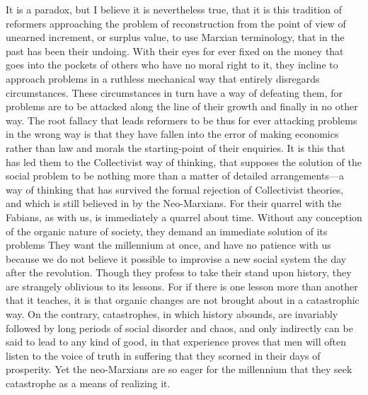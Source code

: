 \documentclass{book}
\begin{document}
It is a paradox, but I believe it is nevertheless true, that it is this tradition of reformers approaching the problem of reconstruction from the point of view of unearned increment, or surplus value, to use Marxian terminology, that in the past has been their undoing. With their eyes for ever fixed on the money that goes into the pockets of others who have no moral right to it, they incline to approach problems in a ruthless mechanical way that entirely disregards circumstances. These circumstances in turn have a way of defeating them, for problems are to be attacked along the line of their growth and finally in no other way. The root fallacy that leads reformers to be thus for ever attacking problems in the wrong way is that they have fallen into the error of making economics rather than law and morals the starting-point of their enquiries. It is this that has led them to the Collectivist way of thinking, that supposes the solution of the social problem to be nothing more than a matter of detailed arrangements—a way of thinking that has survived the formal rejection of Collectivist theories, and which is still believed in by the Neo-Marxians. For their quarrel with the Fabians, as with us, is immediately a quarrel about time. Without any conception of the organic nature of society, they demand an immediate solution of its problems They want the millennium at once, and have no patience with us because we do not believe it possible to improvise a new social system the day after the revolution. Though they profess to take their stand upon history, they are strangely oblivious to its lessons. For if there is one lesson more than another that it teaches, it is that organic changes are not brought about in a catastrophic way. On the contrary, catastrophes, in which history abounds, are invariably followed by long periods of social disorder and chaos, and only indirectly can be said to lead to any kind of good, in that experience proves that men will often listen to the voice of truth in suffering that they scorned in their days of prosperity. Yet the neo-Marxians are so eager for the millennium that they seek catastrophe as a means of realizing it.
\end{document}
